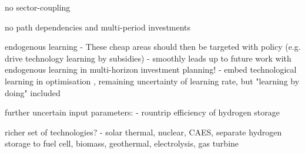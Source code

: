 no sector-coupling

no path dependencies and multi-period investments

endogenous learning
- These cheap areas should then be targeted with policy (e.g. drive technology learning by subsidies)
- smoothly leads up to future work with endogenous learning in multi-horizon investment planning!
- embed technological learning in optimisation \cite{heuberger_power_2017} \cite{lopion_cost_2019}, remaining uncertainty of learning rate, but "learning by doing" included

further uncertain input parameters:
- rountrip efficiency of hydrogen storage

richer set of technologies?
- solar thermal, nuclear, CAES, separate hydrogen storage to fuel cell, biomass, geothermal, electrolysis, gas turbine
